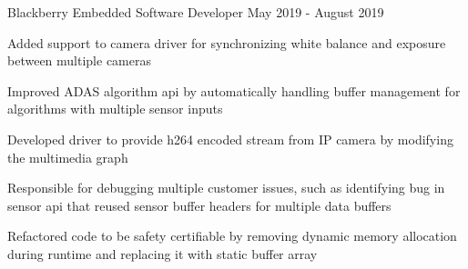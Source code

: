 

\begin{cventries}

  \cventry
    {Blackberry} %
    {Embedded Software Developer} %
    {May 2019 - August 2019} %
    {}
    {
      \begin{cvitems} %
        \item {Added support to camera driver for synchronizing white balance and exposure between multiple cameras}
        \item {Improved ADAS algorithm api by automatically handling buffer management for algorithms with multiple sensor inputs}
        \item {Developed driver to provide h264 encoded stream from IP camera by modifying the multimedia graph}
        \item {Responsible for debugging multiple customer issues, such as identifying bug in sensor api that reused sensor buffer headers for multiple data buffers}
        \item {Refactored code to be safety certifiable by removing dynamic memory allocation during runtime and replacing it with static buffer array}
      \end{cvitems}
    }


\end{cventries}
